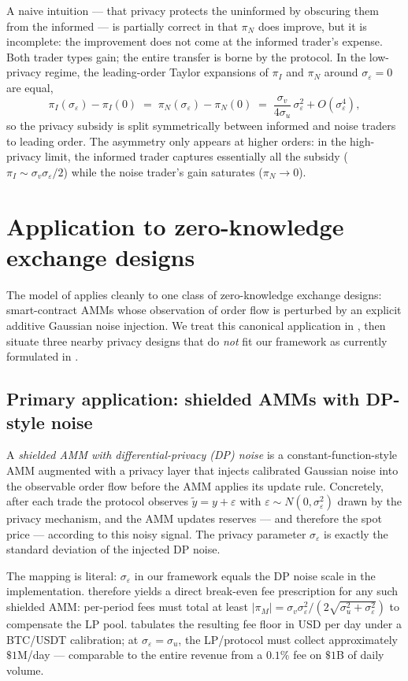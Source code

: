 \documentclass[runningheads]{llncs}
\newcommand{\sigv}{\sigma_v}
\newcommand{\sigu}{\sigma_u}
\newcommand{\sige}{\sigma_\varepsilon}
\newcommand{\ytil}{\tilde y}
\begin{document}
A naive intuition --- that privacy protects the uninformed by
obscuring them from the informed --- is partially correct in that
$\pi_N$ does improve, but it is incomplete: the improvement does
not come at the informed trader's expense. Both trader types gain;
the entire transfer is borne by the protocol. In the low-privacy
regime, the leading-order Taylor expansions of $\pi_I$ and $\pi_N$
around $\sige = 0$ are equal,
\[
\pi_I(\sige) - \pi_I(0)
\;=\; \pi_N(\sige) - \pi_N(0)
\;=\; \frac{\sigv}{4\sigu}\,\sige^2 + O(\sige^4),
\]
so the privacy subsidy is split symmetrically between informed and
noise traders to leading order. The asymmetry only appears at
higher orders: in the high-privacy limit, the informed trader
captures essentially all the subsidy ($\pi_I \sim \sigv\sige/2$)
while the noise trader's gain saturates ($\pi_N \to 0$).

\section{Application to zero-knowledge exchange designs}
\label{sec:application}

The model of  applies cleanly to one class of
zero-knowledge exchange designs: smart-contract AMMs whose
observation of order flow is perturbed by an explicit additive
Gaussian noise injection. We treat this canonical application in
, then situate three nearby privacy
designs that do \emph{not} fit our framework as currently
formulated in .

\subsection{Primary application: shielded AMMs with DP-style noise}
\label{ssec:shielded-amm}

A \emph{shielded AMM with differential-privacy (DP) noise} is a
constant-function-style AMM augmented with a privacy layer that
injects calibrated Gaussian noise into the observable order flow
before the AMM applies its update rule. Concretely, after each
trade the protocol observes $\ytil = y + \varepsilon$ with
$\varepsilon \sim N(0, \sige^2)$ drawn by the privacy mechanism,
and the AMM updates reserves --- and therefore the spot price ---
according to this noisy signal. The privacy parameter $\sige$ is
exactly the standard deviation of the injected DP noise.

\begin{sloppypar}
The mapping is literal: $\sige$ in our framework equals the DP
noise scale in the implementation.  therefore
yields a direct break-even fee prescription for any such shielded
AMM: per-period fees must total at least
$|\pi_M| = \sigv\sige^2/(2\sqrt{\sigu^2 + \sige^2})$ to compensate
the LP pool.  tabulates the resulting fee
floor in USD per day under a BTC/USDT calibration; at
$\sige = \sigu$, the LP/protocol must collect approximately
$\$1$M/day --- comparable to the entire revenue from a $0.1\%$
fee on $\$1$B of daily volume.
\end{sloppypar}
\end{document}
